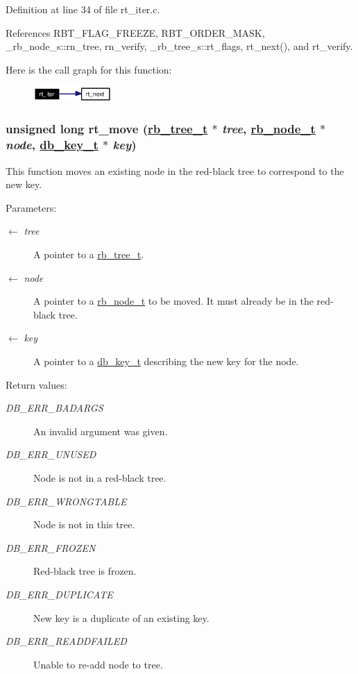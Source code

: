 Definition at line 34 of file rt\_\-iter.c.

References RBT\_\-FLAG\_\-FREEZE, RBT\_\-ORDER\_\-MASK, \_\-rb\_\-node\_\-s::rn\_\-tree, rn\_\-verify, \_\-rb\_\-tree\_\-s::rt\_\-flags, rt\_\-next(), and rt\_\-verify.

Here is the call graph for this function:\begin{figure}[H]
\begin{center}
\leavevmode
\includegraphics[width=85pt]{group__dbprim__rbtree_ga12_cgraph}
\end{center}
\end{figure}
\hypertarget{group__dbprim__rbtree_ga8}{
\subsubsection[rt\_\-move]{\setlength{\rightskip}{0pt plus 5cm}unsigned long rt\_\-move (\hyperlink{struct__rb__tree__s}{rb\_\-tree\_\-t} $\ast$ {\em tree}, \hyperlink{struct__rb__node__s}{rb\_\-node\_\-t} $\ast$ {\em node}, \hyperlink{struct__db__key__s}{db\_\-key\_\-t} $\ast$ {\em key})}}
\label{group__dbprim__rbtree_ga8}


This function moves an existing node in the red-black tree to correspond to the new key.

\begin{Desc}
\item[Parameters:]
\begin{description}
\item[\mbox{$\leftarrow$} {\em tree}]A pointer to a \hyperlink{group__dbprim__rbtree_ga0}{rb\_\-tree\_\-t}. \item[\mbox{$\leftarrow$} {\em node}]A pointer to a \hyperlink{group__dbprim__rbtree_ga1}{rb\_\-node\_\-t} to be moved. It must already be in the red-black tree. \item[\mbox{$\leftarrow$} {\em key}]A pointer to a \hyperlink{group__dbprim_ga0}{db\_\-key\_\-t} describing the new key for the node.\end{description}
\end{Desc}
\begin{Desc}
\item[Return values:]
\begin{description}
\item[{\em DB\_\-ERR\_\-BADARGS}]An invalid argument was given. \item[{\em DB\_\-ERR\_\-UNUSED}]Node is not in a red-black tree. \item[{\em DB\_\-ERR\_\-WRONGTABLE}]Node is not in this tree. \item[{\em DB\_\-ERR\_\-FROZEN}]Red-black tree is frozen. \item[{\em DB\_\-ERR\_\-DUPLICATE}]New key is a duplicate of an existing key. \item[{\em DB\_\-ERR\_\-READDFAILED}]Unable to re-add node to tree.\end{description}
\end{Desc}


